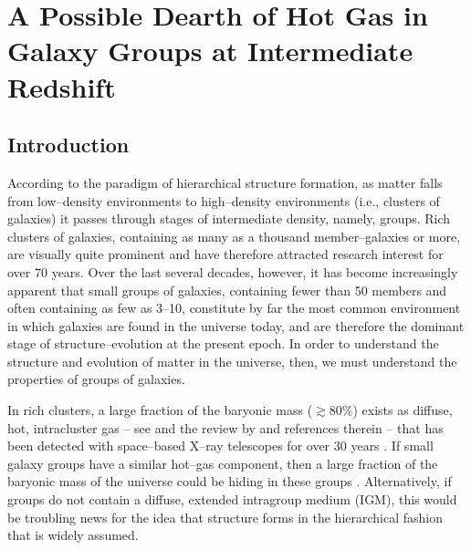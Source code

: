 \chapter[A Possible Dearth of Hot Gas in Galaxy Groups at Intermediate Redshift]{A Possible Dearth of Hot Gas in Galaxy Groups at Intermediate Redshift}
\label{ch:groups}
\markright{}



\section{Introduction}
\label{groups_sec:intro}
According to the paradigm of hierarchical structure formation, as
matter falls from low--density environments to high--density
environments (i.e., clusters of galaxies) it passes through stages of
intermediate density, namely, groups.  Rich clusters of galaxies,
containing as many as a thousand member--galaxies or more, are
visually quite prominent and have therefore attracted research
interest for over 70 years.  Over the last several decades, however,
it has become increasingly apparent that small groups of galaxies,
containing fewer than 50 members and often containing as few as 3--10,
constitute by far the most common environment in which galaxies are
found in the universe today, and are therefore the dominant stage of
structure--evolution at the present epoch.  In order to understand the
structure and evolution of matter in the universe, then, we must
understand the properties of groups of galaxies.

In rich clusters, a large fraction of the baryonic mass ($\gtrsim
80\%$) exists as diffuse, hot, intracluster gas -- see
\citet{ettori_et_al2003} and the review by \citet{rosati_et_al2002}
and references therein -- that has been detected with space--based
X--ray telescopes for over 30 years \citep{giacconi_et_al1974,
rowanrobinson+fabian1975, schwartz1978}.  If small galaxy groups have
a similar hot--gas component, then a large fraction of the baryonic
mass of the universe could be hiding in these groups \citep[and
references therein]{fukugita+peebles2004}.  Alternatively, if groups
do not contain a diffuse, extended intragroup medium (IGM), this would
be troubling news for the idea that structure forms in the
hierarchical fashion that is widely assumed.

